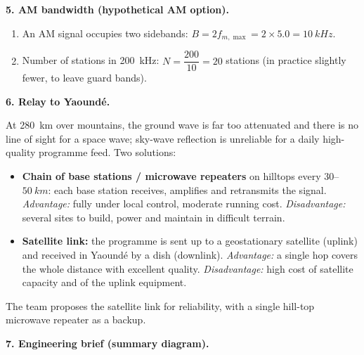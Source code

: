 \documentclass[11pt]{article}
\begin{document}
\textbf{5. AM bandwidth (hypothetical AM option).}\par
\begin{enumerate}
\item An AM signal occupies two sidebands: $B = 2 f_{m,\max} = 2 \times 5.0 = \SI{10}{kHz}$.
\item Number of stations in \SI{200}{kHz}: $N = \dfrac{200}{10} = \boxed{20}$ stations (in practice slightly fewer, to leave guard bands).
\end{enumerate}

\textbf{6. Relay to Yaoundé.}\par
At \SI{280}{km} over mountains, the ground wave is far too attenuated and there is no line of sight for a space wave; sky-wave reflection is unreliable for a daily high-quality programme feed. Two solutions:
\begin{itemize}
\item \textbf{Chain of base stations / microwave repeaters} on hilltops every $30$--$\SI{50}{km}$: each base station receives, amplifies and retransmits the signal. \emph{Advantage:} fully under local control, moderate running cost. \emph{Disadvantage:} several sites to build, power and maintain in difficult terrain.
\item \textbf{Satellite link:} the programme is sent up to a geostationary satellite (uplink) and received in Yaoundé by a dish (downlink). \emph{Advantage:} a single hop covers the whole distance with excellent quality. \emph{Disadvantage:} high cost of satellite capacity and of the uplink equipment.
\end{itemize}
The team proposes the satellite link for reliability, with a single hill-top microwave repeater as a backup.

\textbf{7. Engineering brief (summary diagram).}
\end{document}
